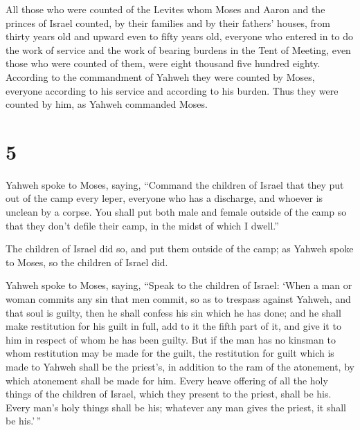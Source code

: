  All those who were counted of the Levites whom Moses and
Aaron and the princes of Israel counted, by their families and by their
fathers' houses,  from thirty years old and upward even
to fifty years old, everyone who entered in to do the work of service
and the work of bearing burdens in the Tent of Meeting, 
even those who were counted of them, were eight thousand five hundred
eighty.  According to the commandment of Yahweh they were
counted by Moses, everyone according to his service and according to his
burden. Thus they were counted by him, as Yahweh commanded Moses.

\hypertarget{section-4}{%
\section{5}\label{section-4}}

 Yahweh spoke to Moses, saying,  ``Command
the children of Israel that they put out of the camp every leper,
everyone who has a discharge, and whoever is unclean by a corpse.
 You shall put both male and female outside of the camp so
that they don't defile their camp, in the midst of which I dwell.''

 The children of Israel did so, and put them outside of
the camp; as Yahweh spoke to Moses, so the children of Israel did.

 Yahweh spoke to Moses, saying,  ``Speak to
the children of Israel: `When a man or woman commits any sin that men
commit, so as to trespass against Yahweh, and that soul is guilty,
 then he shall confess his sin which he has done; and he
shall make restitution for his guilt in full, add to it the fifth part
of it, and give it to him in respect of whom he has been guilty.
 But if the man has no kinsman to whom restitution may be
made for the guilt, the restitution for guilt which is made to Yahweh
shall be the priest's, in addition to the ram of the atonement, by which
atonement shall be made for him.  Every heave offering of
all the holy things of the children of Israel, which they present to the
priest, shall be his.  Every man's holy things shall be
his; whatever any man gives the priest, it shall be his.'\,''

